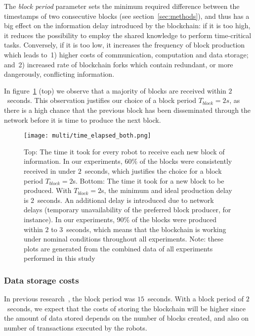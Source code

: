 \documentclass[runningheads]{llncs}
\begin{document}
The \emph{block period} parameter sets the minimum required difference between the timestamps of two consecutive blocks (see section~\ref{sec:methods}), and thus has a big effect on the information delay introduced by the blockchain: if it is too high, it reduces the possibility to employ the shared knowledge to perform time-critical tasks. Conversely, if it is too low, it increases the frequency of block production which leads to~1) higher costs of communication, computation and data storage; and~2) increased rate of blockchain forks which contain redundant, or more dangerously, conflicting information.
 
 In figure~\ref{fig:block-histograms} (top) we observe that a majority of blocks are received within $2$~seconds. This observation justifies our choice of a block period $T_{block}=2s$, as there is a high chance that the previous block has been disseminated through the network before it is time to produce the next block.

\begin{figure}
  \centering
  \texttt{[image: multi/time\_elapsed\_both.png]}
  \caption{Top: The time it took for every robot to receive each new block of information. In our experiments, 60\% of the blocks were consistently received in under $2$~seconds, which justifies the choice for a block period $T_{block}=2$s. Bottom: The time it took for a new block to be produced. With $T_{block}=2$s, the minimum and ideal production delay is $2$~seconds. An additional delay is introduced due to network delays (temporary unavailability of the preferred block producer, for instance). In our experiments, 90\% of the blocks were produced within $2$ to $3$~seconds, which means that the blockchain is working under nominal conditions throughout all experiments. Note: these plots are generated from the combined data of all experiments performed in this study}
  \label{fig:block-histograms}
\end{figure}

\subsubsection{Data storage costs}

In previous research~\cite{pacheco_ants_2020,StrCasDor2018:aamas}, the block period was $15$~seconds. With a block period of $2$~seconds, we expect that the costs of storing the blockchain will be higher since the amount of data stored depends on the number of blocks created, and also on number of transactions executed by the robots. 
\end{document}
